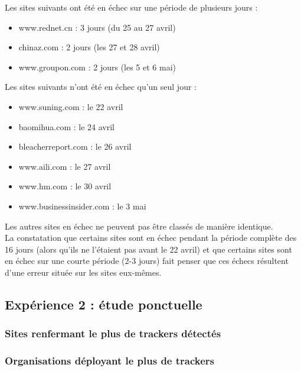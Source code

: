 Les sites suivants ont été en échec sur une période de plusieurs jours :
\begin{itemize}
  \item www.rednet.cn : 3 jours (du 25 au 27 avril)
  \item chinaz.com : 2 jours (les 27 et 28 avril)
  \item www.groupon.com : 2 jours (les 5 et 6 mai)
  \newline
\end{itemize}
Les sites suivants n'ont été en échec qu'un seul jour :
\begin{itemize}
  \item www.suning.com : le 22 avril
  \item baomihua.com : le 24 avril
  \item bleacherreport.com : le 26 avril
  \item www.aili.com : le 27 avril
  \item www.hm.com : le 30 avril
  \item www.businessinsider.com : le 3 mai
  \newline
\end{itemize}
Les autres sites en échec ne peuvent pas être classés de manière identique.\\

La constatation que certains sites sont en échec pendant la période complète des 16 jours (alors qu'ils ne l'étaient pas avant le 22 avril) et que certains sites sont en échec sur une courte période (2-3 jours) fait penser que ces échecs résultent d'une erreur située sur les sites eux-mêmes.

\subsection{Expérience 2 : étude ponctuelle}

\subsubsection{Sites renfermant le plus de trackers détectés}

\subsubsection{Organisations déployant le plus de trackers}
